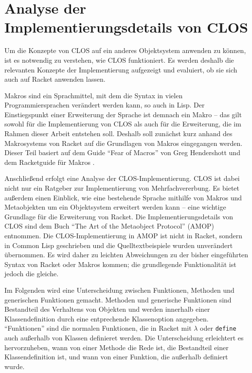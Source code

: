 \chapter{Analyse der Implementierungsdetails von CLOS}
Um die Konzepte von CLOS auf ein anderes Objektsystem anwenden zu können, ist es notwendig zu verstehen, wie CLOS funktioniert. Es werden deshalb die relevanten Konzepte der Implementierung aufgezeigt und evaluiert, ob sie sich auch auf Racket anwenden lassen.

Makros sind ein Sprachmittel, mit dem die Syntax in vielen Programmiersprachen verändert werden kann, so auch in Lisp. Der Einstiegspunkt einer Erweiterung der Sprache ist demnach ein Makro -- das gilt sowohl für die Implementierung von CLOS als auch für die Erweiterung, die im Rahmen dieser Arbeit entstehen soll. Deshalb soll zunächst kurz anhand des Makrosystems von Racket auf die Grundlagen von Makros eingegangen werden. Dieser Teil basiert auf dem Guide ``Fear of Macros'' von Greg Hendershott \cite{fearofmacros} und dem Racketguide für Makros \cite{racketguide-macros}.

Anschließend erfolgt eine Analyse der CLOS-Implementierung. CLOS ist dabei nicht nur ein Ratgeber zur Implementierung von Mehrfachvererbung. Es bietet außerdem einen Einblick, wie eine bestehende Sprache mithilfe von Makros und Metaobjekten um ein Objektsystem erweitert werden kann -- eine wichtige Grundlage für die Erweiterung von Racket. Die Implementierungsdetails von CLOS sind dem Buch ``The Art of the Metaobject Protocol'' (AMOP) \cite{amop} entnommen. Die CLOS-Implementierung in AMOP ist nicht in Racket, sondern in Common Lisp geschrieben und die Quelltextbeispiele wurden unverändert übernommen. Es wird daher zu leichten Abweichungen zu der bisher eingeführten Syntax von Racket oder Makros kommen; die grundlegende Funktionalität ist jedoch die gleiche.

Im Folgenden wird eine Unterscheidung zwischen Funktionen, Methoden und generischen Funktionen gemacht. Methoden und generische Funktionen sind Bestandteil des Verhaltens von Objekten und werden innerhalb einer Klassendefinition durch eine entprechende Klassenoption angegeben. ``Funktionen'' sind die normalen Funktionen, die in Racket mit \texttt{$\lambda$} oder \texttt{define} auch außerhalb von Klassen definieret werden. Die Unterscheidung erleichtert es hervorzuheben, wann von einer Methode die Rede ist, die Bestandteil einer Klassendefinition ist, und wann von einer Funktion, die außerhalb definiert wurde.

